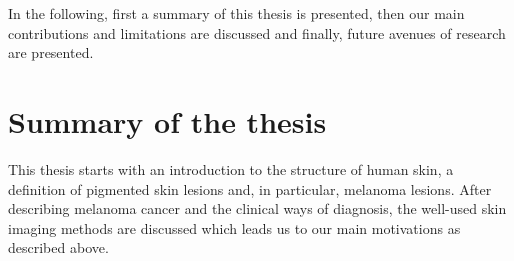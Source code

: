 In the following, first a summary of this thesis is presented, then our main contributions and limitations are discussed and finally, future avenues of research are presented.

\section{Summary of the thesis}\label{sec:chp6-sec1}
This thesis starts with an introduction to the structure of human skin, a definition of pigmented skin lesions and, in particular, melanoma lesions.
After describing melanoma cancer and the clinical ways of diagnosis, the well-used skin imaging methods are discussed which leads us to our main motivations as described above.

